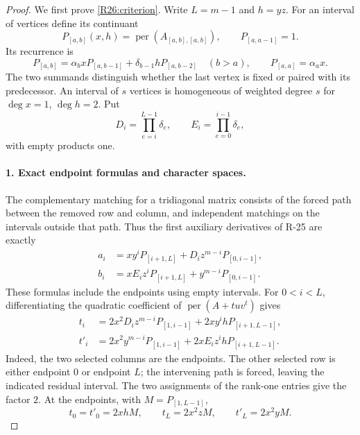 \begin{proof}
We first prove \eqref{R26:criterion}. Write $L=m-1$ and $h=yz$.
For an interval of vertices define its continuant
\[
 P_{[a,b]}(x,h)=\operatorname{per}(A_{[a,b],[a,b]}),\qquad
 P_{[a,a-1]}=1.
\]
Its recurrence is
\begin{equation}\label{R26:continuant}
 P_{[a,b]}=\alpha_bxP_{[a,b-1]}
                   +\delta_{b-1}hP_{[a,b-2]}\quad(b>a),
 \qquad P_{[a,a]}=\alpha_ax.
\end{equation}
The two summands distinguish whether the last vertex is fixed or
paired with its predecessor. An interval of $s$ vertices is
homogeneous of weighted degree $s$ for $\deg x=1$, $\deg h=2$.
Put
\[
 D_i=\prod_{e=i}^{L-1}\delta_e,\qquad
 E_i=\prod_{e=0}^{i-1}\delta_e,
\]
with empty products one.

\paragraph{1. Exact endpoint formulas and character spaces.}
The complementary matching for a tridiagonal matrix consists of
the forced path between the removed row and column, and independent
matchings on the intervals outside that path. Thus the first
auxiliary derivatives of R-25 are exactly
\begin{align}
 a_i&=x y^iP_{[i+1,L]}+D_i z^{m-i}P_{[0,i-1]},\label{R26:a}\\
 b_i&=x E_i z^iP_{[i+1,L]}+y^{m-i}P_{[0,i-1]}.
                                                        \label{R26:b}
\end{align}
These formulas include the endpoints using empty intervals.
For $0<i<L$, differentiating the quadratic coefficient of
$\operatorname{per}(A+tuv^t)$ gives
\begin{align}
 t_i&=2x^2D_i z^{m-i}P_{[1,i-1]}
           +2xy^ihP_{[i+1,L-1]},\label{R26:t}\\
 t'_i&=2x^2y^{m-i}P_{[1,i-1]}
           +2xE_i z^ihP_{[i+1,L-1]}.
                                                        \label{R26:tp}
\end{align}
Indeed, the two selected columns are the endpoints. The other
selected row is either endpoint $0$ or endpoint $L$; the intervening
path is forced, leaving the indicated residual interval. The two
assignments of the rank-one entries give the factor $2$.
At the endpoints, with $M=P_{[1,L-1]}$,
\begin{equation}\label{R26:endpoints}
 t_0=t'_0=2xhM,\qquad t_L=2x^2zM,\qquad t'_L=2x^2yM.
\end{equation}


\end{proof}
